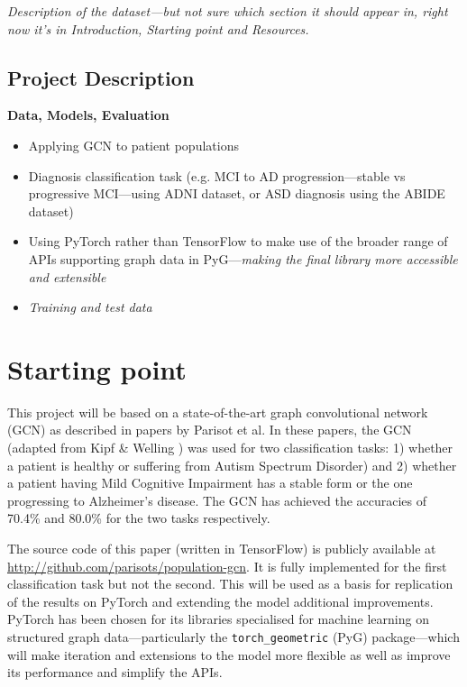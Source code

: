 \documentclass[12pt,a4paper,twoside]{article}
\begin{document}

\textit{Description of the dataset—but not sure which section it should appear in, right now it's in Introduction, Starting point and Resources.}

\subsection*{Project Description}
\textbf{Data, Models, Evaluation}

\begin{itemize}
  \item Applying GCN to patient populations
  \item Diagnosis classification task (e.g. MCI to AD progression—stable vs progressive MCI—using ADNI dataset, or ASD diagnosis using the ABIDE dataset)
  \item Using PyTorch rather than TensorFlow to make use of the broader range of APIs supporting graph data in PyG—\textit{making the final library more accessible and extensible}
  \item \textit{Training and test data}
\end{itemize}

\section*{Starting point}


This project will be based on a state-of-the-art graph convolutional network (GCN) as described in papers by Parisot et al. \cite{parisot2017spectral, parisot2018disease} In these papers, the GCN (adapted from Kipf \& Welling \cite{kipf2017semi}) was used for two classification tasks: 1) whether a patient is  healthy or suffering from Autism Spectrum Disorder) and 2) whether a patient having Mild Cognitive Impairment has a stable form or the one progressing to Alzheimer's disease. The GCN has achieved the accuracies of 70.4\% and 80.0\% for the two tasks respectively. 

The source code of this paper (written in TensorFlow) is publicly available at \url{http://github.com/parisots/population-gcn}. It is fully implemented for the first classification task but not the second. This will be used as a basis for replication of the results on PyTorch and extending the model additional improvements. PyTorch has been chosen for its libraries specialised for machine learning on structured graph data—particularly the \texttt{torch\_geometric} (PyG) package—which will make iteration and extensions to the model more flexible as well as improve its performance and simplify the APIs.
\end{document}
